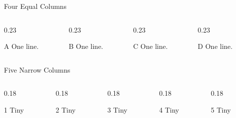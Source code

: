 \documentclass[aspectratio=169]{beamer}
\begin{document}
\begin{frame}{Four Equal Columns}
  \begin{columns}[T]
    \begin{column}{0.23\textwidth}
      \begin{block}{A}
        {\scriptsize One line.}
      \end{block}
    \end{column}
    \begin{column}{0.23\textwidth}
      \begin{block}{B}
        {\scriptsize One line.}
      \end{block}
    \end{column}
    \begin{column}{0.23\textwidth}
      \begin{block}{C}
        {\scriptsize One line.}
      \end{block}
    \end{column}
    \begin{column}{0.23\textwidth}
      \begin{block}{D}
        {\scriptsize One line.}
      \end{block}
    \end{column}
  \end{columns}
\end{frame}

\begin{frame}{Five Narrow Columns}
  \begin{columns}[T]
    \begin{column}{0.18\textwidth}
      \begin{block}{1}
        {\tiny Tiny}
      \end{block}
    \end{column}
    \begin{column}{0.18\textwidth}
      \begin{block}{2}
        {\tiny Tiny}
      \end{block}
    \end{column}
    \begin{column}{0.18\textwidth}
      \begin{block}{3}
        {\tiny Tiny}
      \end{block}
    \end{column}
    \begin{column}{0.18\textwidth}
      \begin{block}{4}
        {\tiny Tiny}
      \end{block}
    \end{column}
    \begin{column}{0.18\textwidth}
      \begin{block}{5}
        {\tiny Tiny}
      \end{block}
    \end{column}
  \end{columns}
\end{frame}
\end{document}
